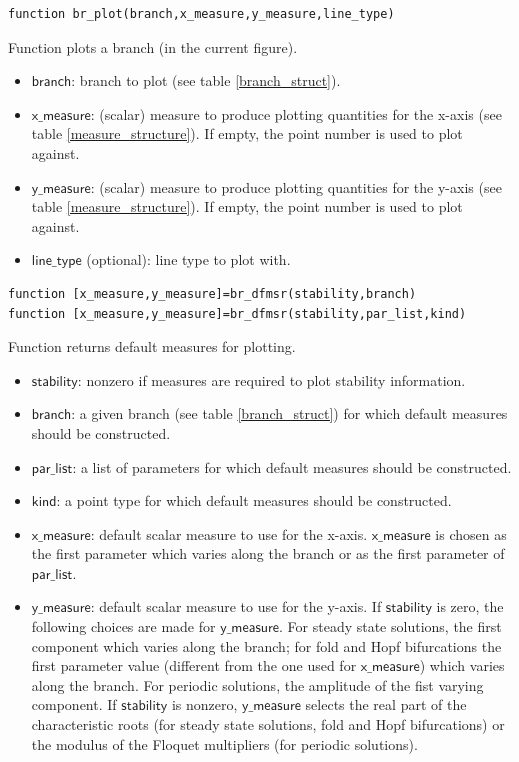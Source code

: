 \documentclass[10pt]{article}
\gdef \file#1{{\bfseries{\ttfamily{#1}}}}
\gdef \parm#1{{\mathsf{#1}}}
\begin{document}
{{\small\begin{verbatim}
function br_plot(branch,x_measure,y_measure,line_type)
\end{verbatim}}
\noindent Function \file{br\_plot} plots a branch (in the current figure). 
\begin{itemize}
\item $\parm{branch}$: branch to plot (see table \ref{branch_struct}).
\item $\parm{x\_measure}$: (scalar) measure to produce plotting quantities
for the x-axis (see table \ref{measure_structure}). 
If empty, the point number is used to plot against.
\item $\parm{y\_measure}$: (scalar) measure to produce plotting quantities
for the y-axis (see table \ref{measure_structure}). 
If empty, the point number is used to plot against.
\item $\parm{line\_type}$ (optional): line type to plot with.
\end{itemize}

{\small\begin{verbatim}
function [x_measure,y_measure]=br_dfmsr(stability,branch)
function [x_measure,y_measure]=br_dfmsr(stability,par_list,kind)
\end{verbatim}}
\noindent Function \file{br\_measur} returns default measures
for plotting. 
\begin{itemize}
\item $\parm{stability}$: nonzero if measures are required to plot
stability information.
\item $\parm{branch}$: a given branch (see table \ref{branch_struct})
for which default measures should be constructed.
\item $\parm{par\_list}$: a list of parameters 
for which default measures should be constructed.
\item $\parm{kind}$: a point type 
for which default measures should be constructed.
\item $\parm{x\_measure}$: default scalar measure to use for the x-axis.
$\parm{x\_measure}$ is chosen as the first parameter which varies along
the branch or as the first parameter of $\parm{par\_list}$.
\item $\parm{y\_measure}$: default scalar measure to use for the y-axis.
If $\parm{stability}$ is zero, the following choices are
made for $\parm{y\_measure}$. For steady state solutions, 
the first component which varies along the branch; for fold and 
Hopf bifurcations 
the first parameter value (different from the one used
for $\parm{x\_measure}$) which varies along the branch. For 
periodic solutions, 
the amplitude of the fist varying component.
If $\parm{stability}$ is nonzero, $\parm{y\_measure}$ selects 
the real part of the characteristic roots (for steady state solutions, fold
and Hopf bifurcations) or
the modulus of the Floquet multipliers (for periodic solutions).
\end{itemize}

}
\end{document}
